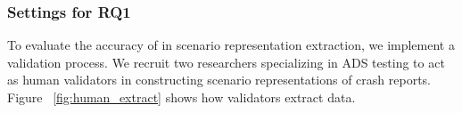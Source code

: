 
\subsubsection{Settings for RQ1}
To evaluate the accuracy of {\tool} in scenario representation extraction, we implement a validation process. We recruit two researchers specializing in ADS testing to act as human validators in constructing scenario representations of crash reports. Figure ~\ref{fig:human_extract} shows how validators extract data.


